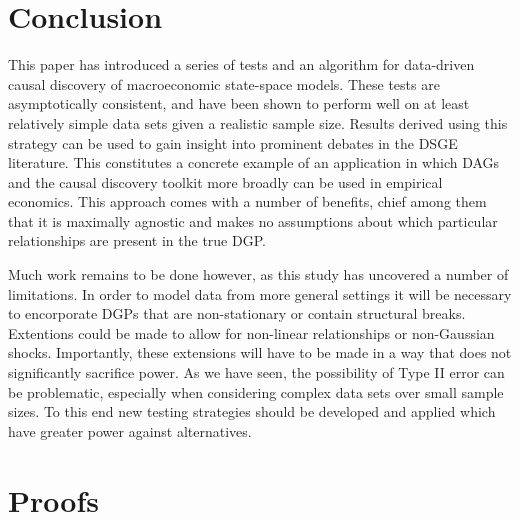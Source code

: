 \documentclass{article}
\begin{document}
\section{Conclusion} \label{conclusion}

This paper has introduced a series of tests and an algorithm for data-driven causal discovery of macroeconomic state-space models. These tests are asymptotically consistent, and have been shown to perform well on at least relatively simple data sets given a realistic sample size. Results derived using this strategy can be used to gain insight into prominent debates in the DSGE literature. This constitutes a concrete example of an application in which DAGs and the causal discovery toolkit more broadly can be used in empirical economics. This approach comes with a number of benefits, chief among them that it is maximally agnostic and makes no assumptions about which particular relationships are present in the true DGP. 

Much work remains to be done however, as this study has uncovered a number of limitations. In order to model data from more general settings it will be necessary to encorporate DGPs that are non-stationary or contain structural breaks. Extentions could be made to allow for non-linear relationships or non-Gaussian shocks. Importantly, these extensions will have to be made in a way that does not significantly sacrifice power. As we have seen, the possibility of Type II error can be problematic, especially when considering complex data sets over small sample sizes. To this end new testing strategies should be developed and applied which have greater power against alternatives. 

\newpage
\printbibliography

\newpage
\appendix
\section{Proofs} \label{proofs}
\end{document}
